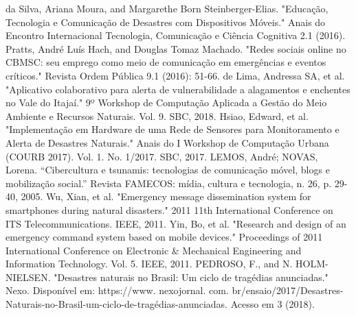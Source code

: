 \documentclass[conference]{IEEEtran}
\begin{document}
\begin{thebibliography}{00}
 da Silva, Ariana Moura, and Margarethe Born Steinberger-Elias. "Educação, Tecnologia e Comunicação de Desastres com Dispositivos Móveis." Anais do Encontro Internacional Tecnologia, Comunicação e Ciência Cognitiva 2.1 (2016).
 Pratts, André Luís Hach, and Douglas Tomaz Machado. "Redes sociais online no CBMSC: seu emprego como meio de comunicação em emergências e eventos críticos." Revista Ordem Pública 9.1 (2016): 51-66.
 de Lima, Andressa SA, et al. "Aplicativo colaborativo para alerta de vulnerabilidade a alagamentos e enchentes no Vale do Itajaí." 9º Workshop de Computação Aplicada a Gestão do Meio Ambiente e Recursos Naturais. Vol. 9. SBC, 2018.
 Hsiao, Edward, et al. "Implementação em Hardware de uma Rede de Sensores para Monitoramento e Alerta de Desastres Naturais." Anais do I Workshop de Computação Urbana (COURB 2017). Vol. 1. No. 1/2017. SBC, 2017.
 LEMOS, André; NOVAS, Lorena. “Cibercultura e tsunamis: tecnologias de comunicação móvel, blogs e mobilização social.” Revista FAMECOS: mídia, cultura e tecnologia, n. 26, p. 29-40, 2005.
 Wu, Xian, et al. "Emergency message dissemination system for smartphones during natural disasters." 2011 11th International Conference on ITS Telecommunications. IEEE, 2011.
 Yin, Bo, et al. "Research and design of an emergency command system based on mobile devices." Proceedings of 2011 International Conference on Electronic \& Mechanical Engineering and Information Technology. Vol. 5. IEEE, 2011.
 PEDROSO, F., and N. HOLM-NIELSEN. "Desastres naturais no Brasil: Um ciclo de tragédias anunciadas." Nexo. Disponível em: https://www. nexojornal. com. br/ensaio/2017/Desastres-Naturais-no-Brasil-um-ciclo-de-tragédias-anunciadas. Acesso em 3 (2018).
\end{thebibliography}
\vspace{12pt}
\end{document}

